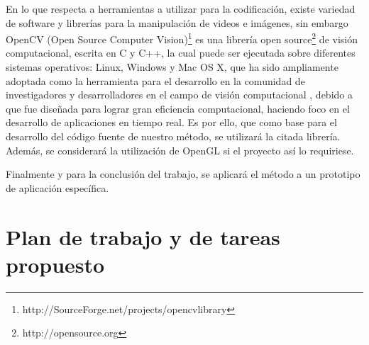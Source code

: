 \documentclass[a4paper,11pt,spanish]{article}
\begin{document}
En lo que respecta a herramientas a utilizar para la codificación, existe variedad de software y librerías para la manipulación de videos e imágenes, sin embargo
OpenCV (Open Source Computer Vision)\footnote[1]{http://SourceForge.net/projects/opencvlibrary} es una librería open source\footnote[2]{http://opensource.org} de 
visión computacional, escrita en C y C++, la cual puede ser ejecutada sobre diferentes sistemas operativos: Linux, Windows y Mac OS X, que ha sido ampliamente 
adoptada como la herramienta para el desarrollo en la comunidad de investigadores y desarrolladores en el campo de visión computacional \cite{citeulike:9456628}, debido
a que fue diseñada para lograr gran eficiencia computacional, haciendo foco en el desarrollo de aplicaciones en tiempo real. Es por ello, que como base para el desarrollo 
del código fuente de nuestro método, se utilizará la citada librería. Además, se considerará la utilización de OpenGL si el proyecto así lo requiriese.

Finalmente y para la conclusión del trabajo, se aplicará el método a un prototipo de aplicación específica.

\section{Plan de trabajo y de tareas propuesto}
\end{document}
